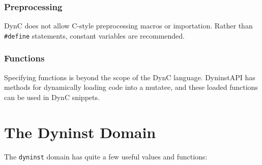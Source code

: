 \documentclass{article}
\begin{document}
\subsubsection{Preprocessing}
DynC does not allow C-style preprocessing macros or importation. Rather than \verb!#define! statements, constant variables are recommended.

\subsubsection{Functions}
Specifying functions is beyond the scope of the DynC language. DyninstAPI has methods for dynamically loading code into a mutatee, and these loaded functions can be used in DynC snippets.
\pagebreak

\appendix
\section{The Dyninst Domain}
\label{sec:dyninstdomain}
The \verb!dyninst! domain has quite a few useful values and functions:
\end{document}

